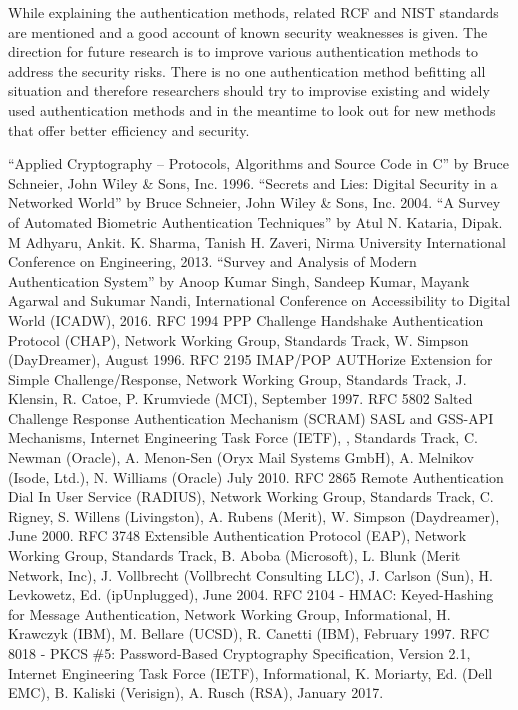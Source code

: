 \begin{multicols}{2}
While explaining the authentication methods, related RCF and NIST standards are mentioned and a good account of known security weaknesses is given. The direction for future research is to improve various authentication methods to address the security risks. There is no one authentication method befitting all situation and therefore researchers should try to improvise existing and widely used authentication methods and in the meantime to look out for new methods that offer better efficiency and security.
\begin{thebibliography}{99}
 ``Applied Cryptography -- Protocols, Algorithms and Source Code in C'' by Bruce Schneier, John Wiley \& Sons, Inc. 1996.
 ``Secrets and Lies: Digital Security in a Networked World'' by Bruce Schneier, John Wiley \& Sons, Inc. 2004.
 ``A Survey of Automated Biometric Authentication Techniques'' by Atul N. Kataria, Dipak. M Adhyaru, Ankit. K. Sharma, Tanish H. Zaveri, Nirma University International Conference on Engineering, 2013.
 ``Survey and Analysis of Modern Authentication System'' by Anoop Kumar Singh, Sandeep Kumar, Mayank Agarwal and Sukumar Nandi,  International Conference on Accessibility to Digital World (ICADW), 2016.
 RFC 1994 PPP Challenge Handshake Authentication Protocol (CHAP), Network Working Group, Standards Track, W. Simpson (DayDreamer), August 1996.
 RFC 2195 IMAP/POP AUTHorize Extension for Simple Challenge/Response, Network Working Group, Standards Track, J. Klensin, R. Catoe, P. Krumviede (MCI), September 1997.
 RFC 5802 Salted Challenge Response Authentication Mechanism (SCRAM) SASL and GSS-API Mechanisms, Internet Engineering Task Force (IETF), , Standards Track, C. Newman (Oracle), A. Menon-Sen (Oryx Mail Systems GmbH), A. Melnikov (Isode, Ltd.), N. Williams (Oracle) July 2010.
 RFC 2865 Remote Authentication Dial In User Service (RADIUS), Network Working Group, Standards Track, C. Rigney, S. Willens (Livingston), A. Rubens (Merit), W. Simpson (Daydreamer), June 2000.
 RFC 3748 Extensible Authentication Protocol (EAP), Network Working Group, Standards Track, B. Aboba (Microsoft), L. Blunk (Merit Network, Inc), J. Vollbrecht (Vollbrecht Consulting LLC), J. Carlson (Sun), H. Levkowetz, Ed. (ipUnplugged), June 2004.
 RFC 2104 - HMAC: Keyed-Hashing for Message Authentication, Network Working Group, Informational, H. Krawczyk (IBM), M. Bellare (UCSD), R. Canetti (IBM), February 1997.
 RFC 8018 - PKCS \#5: Password-Based Cryptography Specification, Version 2.1, Internet Engineering Task Force (IETF), Informational, K. Moriarty, Ed. (Dell EMC), B. Kaliski (Verisign), A. Rusch (RSA), January 2017. 

\end{thebibliography}
\end{multicols}
